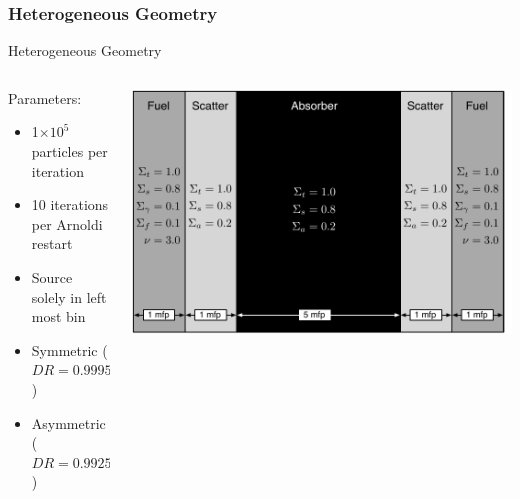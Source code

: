 \documentclass[xcolor={usenames, dvipsnames},]{beamer}
\newcommand{\e}[1]{\ensuremath{\times 10^{#1}}}
\begin{document}
\subsubsection{Heterogeneous Geometry}
\begin{frame}{Heterogeneous Geometry}
\begin{columns}
    \begin{column}{0.3\textwidth}
    Parameters:
    \begin{itemize}
        \item 1\e{5} particles per iteration
        \item 10 iterations per Arnoldi restart
        \item Source solely in left most bin
        \item Symmetric ($DR = 0.999566$)
        \item Asymmetric ($DR = 0.992504$)
    \end{itemize}
    \end{column}
   
    \begin{column}{0.7\textwidth}
        \includegraphics[width=\textwidth, keepaspectratio]{Figures/MultimediaCartoon}
    \end{column}
\end{columns}
\end{frame}
\end{document}
